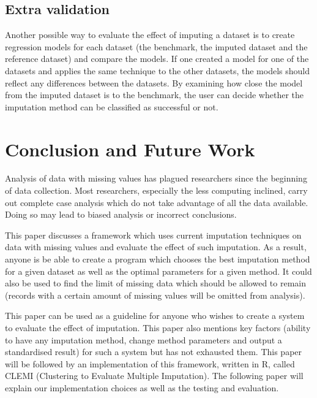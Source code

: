 \documentclass[conference,compsoc]{IEEEtran}
\begin{document}

		\subsection{Extra validation} %
		\label{sub:extra_validation}
			Another possible way to evaluate the effect of imputing a dataset is to create regression models for each dataset (the benchmark, the imputed dataset and the reference dataset) and compare the models. If one created a model for one of the datasets and applies the same technique to the other datasets, the models should reflect any differences between the datasets. By examining how close the model from the imputed dataset is to the benchmark, the user can decide whether the imputation method can be classified as successful or not.


	\section{Conclusion and Future Work} %
	\label{sec:conclusion}
		Analysis of data with missing values has plagued researchers since the beginning of data collection. Most researchers, especially the less computing inclined, carry out complete case analysis which do not take advantage of all the data available. Doing so may lead to biased analysis or incorrect conclusions. 

		This paper discusses a framework which uses current imputation techniques on data with missing values and evaluate the effect of such imputation. As a result, anyone is be able to create a program which chooses the best imputation method for a given dataset as well as the optimal parameters for a given method. It could also be used to find the limit of missing data which should be allowed to remain (records with a certain amount of missing values will be omitted from analysis).

		This paper can be used as a guideline for anyone who wishes to create a system to evaluate the effect of imputation. This paper also mentions key factors (ability to have any imputation method, change method parameters and output a standardised result) for such a system but has not exhausted them. This paper will be followed by an implementation of this framework, written in R, called CLEMI (Clustering to Evaluate Multiple Imputation). The following paper will explain our implementation choices as well as the testing and evaluation. 



	
	
\end{document}

